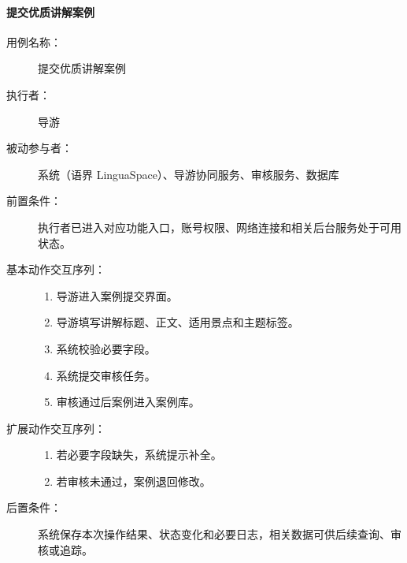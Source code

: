 \paragraph{提交优质讲解案例}
\begin{description}
  \item[用例名称：] 提交优质讲解案例
  \item[执行者：] 导游
  \item[被动参与者：] 系统（语界 LinguaSpace）、导游协同服务、审核服务、数据库
  \item[前置条件：] 执行者已进入对应功能入口，账号权限、网络连接和相关后台服务处于可用状态。
  \item[基本动作交互序列：]
  \begin{enumerate}
    \item 导游进入案例提交界面。
    \item 导游填写讲解标题、正文、适用景点和主题标签。
    \item 系统校验必要字段。
    \item 系统提交审核任务。
    \item 审核通过后案例进入案例库。
  \end{enumerate}
  \item[扩展动作交互序列：]
  \begin{enumerate}
    \item[3a.] 若必要字段缺失，系统提示补全。
    \item[5a.] 若审核未通过，案例退回修改。
  \end{enumerate}
  \item[后置条件：] 系统保存本次操作结果、状态变化和必要日志，相关数据可供后续查询、审核或追踪。
\end{description}

